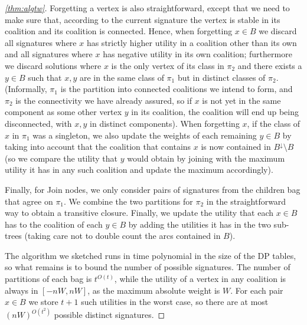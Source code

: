 \documentclass[letterpaper,USenglish,cleveref, autoref, thm-restate]{lipics-v2021}
\begin{document}
\begin{proof}[\cref{thm:algtw}]
Forgetting a vertex is also straightforward, except that we need to make sure
that, according to the current signature the vertex is stable in its coalition
and its coalition is connected. Hence, when forgetting $x\in B$ we discard
all signatures where $x$ has strictly higher utility in a coalition other than
its own and all signatures where $x$ has negative utility in its own coalition;
furthermore we discard solutions where $x$ is the only vertex of its class in
$\pi_2$ and there exists a $y\in B$ such that $x,y$ are in the same class of
$\pi_1$ but in distinct classes of $\pi_2$.  (Informally, $\pi_1$ is the
partition into connected coalitions we intend to form, and $\pi_2$ is the
connectivity we have already assured, so if $x$ is not yet in the same
component as some other vertex $y$ in its coalition, the coalition will end up
being disconnected, with $x,y$ in distinct components).  When forgetting $x$,
if the class of $x$ in $\pi_1$ was a singleton, we also update the weights of
each remaining $y\in B$ by taking into account that the coalition that contains
$x$ is now contained in $B^{\downarrow}\setminus B$ (so we compare the utility
that $y$ would obtain by joining with the maximum utility it has in any such
coalition and update the maximum accordingly).

Finally, for Join nodes, we only consider pairs of signatures from the children
bag that agree on $\pi_1$. We combine the two partitions for $\pi_2$ in the
straightforward way to obtain a transitive closure. Finally, we update the
utility that each $x\in B$ has to the coalition of each $y\in B$ by adding the
utilities it has in the two sub-trees (taking care not to double count the arcs
contained in $B$).

The algorithm we sketched runs in time polynomial in the size of the DP tables,
so what remains is to bound the number of possible signatures. The number of
partitions of each bag is $t^{O(t)}$, while the utility of a vertex in any
coalition is always in $[-nW,nW]$, as the maximum absolute weight is $W$. For
each pair $x\in B$ we store $t+1$ such utilities in the worst case, so there
are at most $(nW)^{O(t^2)}$ possible distinct signatures.  \end{proof}
\end{document}
